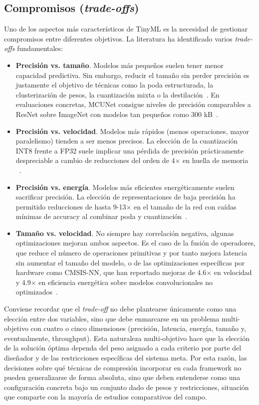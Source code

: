 \documentclass[a4paper,12pt,twoside,final]{book}
\begin{document}
\subsection{Compromisos (\textit{trade-offs})}
Uno de los aspectos más característicos de TinyML es la necesidad de gestionar compromisos entre diferentes
objetivos. La literatura ha identificado varios \textit{trade-offs} fundamentales:
\begin{itemize}
  \item \textbf{Precisión vs. tamaño}. Modelos más pequeños suelen tener menor capacidad predictiva. Sin embargo,
  reducir el tamaño sin perder precisión es justamente el objetivo de técnicas como la poda estructurada, la
  clusterización de pesos, la cuantización mixta o la destilación~\cite{somvanshi2025acm}. En evaluaciones concretas,
  MCUNet consigue niveles de precisión comparables a ResNet sobre ImageNet con modelos tan pequeños como
  300 kB~\cite{somvanshi2025acm}.
  \item \textbf{Precisión vs. velocidad}. Modelos más rápidos (menos operaciones, mayor paralelismo) tienden a ser
  menos precisos. La elección de la cuantización INT8 frente a FP32 suele implicar una pérdida de precisión
  prácticamente despreciable a cambio de reducciones del orden de 4$\times$ en huella de memoria
  ~\cite{somvanshi2025acm}.
  \item \textbf{Precisión vs. energía}. Modelos más eficientes energéticamente suelen sacrificar precisión. La elección
  de representaciones de baja precisión ha permitido reducciones de hasta 9-13$\times$ en el tamaño de la red con
  caídas mínimas de accuracy al combinar poda y cuantización~\cite{somvanshi2025acm}.
  \item \textbf{Tamaño vs. velocidad}. No siempre hay correlación negativa, algunas optimizaciones mejoran ambos
  aspectos. Es el caso de la fusión de operadores, que reduce el número de operaciones primitivas y por tanto mejora
  latencia sin aumentar el tamaño del modelo, o de las optimizaciones específicas por hardware como CMSIS-NN, que han
  reportado mejoras de 4.6$\times$ en velocidad y 4.9$\times$ en eficiencia energética sobre modelos convolucionales no
  optimizados~\cite{lin2023ieeemcas,somvanshi2025acm}.
\end{itemize}

Conviene recordar que el \textit{trade-off} no debe plantearse únicamente como una elección entre dos variables,
sino que debe enmarcarse en un problema multi-objetivo con cuatro o cinco dimensiones (precisión, latencia, energía,
tamaño y, eventualmente, throughput). Esta naturaleza multi-objetivo hace que la elección de la solución óptima
dependa del peso asignado a cada criterio por parte del diseñador y de las restricciones específicas del sistema
meta. Por esta razón, las decisiones sobre qué técnicas de compresión incorporar en cada framework no pueden
generalizarse de forma absoluta, sino que deben entenderse como una configuración concreta bajo un conjunto dado de
pesos y restricciones, situación que comparte con la mayoría de estudios comparativos del campo.
\end{document}
